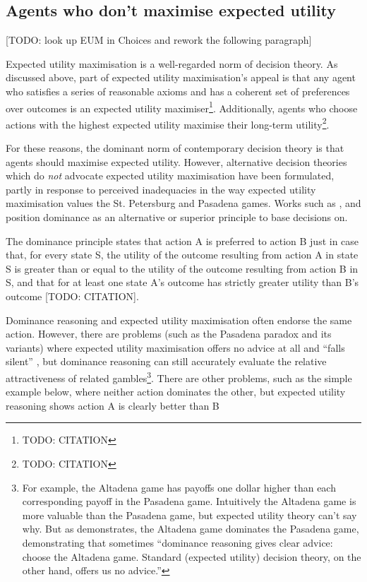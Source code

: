 \documentclass{article}
\begin{document}
\subsection{Agents who don't maximise expected utility}

[TODO: look up EUM in Choices and rework the following paragraph]

Expected utility maximisation is a well-regarded norm of decision theory. As discussed above, part of expected utility maximisation's appeal is that any agent who satisfies a series of reasonable axioms and has a coherent set of preferences over outcomes is an expected utility maximiser\footnote{TODO: CITATION}. Additionally, agents who choose actions with the highest expected utility maximise their long-term utility\footnote{TODO: CITATION}. 

For these reasons, the dominant norm of contemporary decision theory is that agents should maximise expected utility. However, alternative decision theories which do \textit{not} advocate expected utility maximisation have been formulated, partly in response to perceived inadequacies in the way expected utility maximisation values the St. Petersburg and Pasadena games. Works such as \citep{easwaran2009dominance}, \citep{colyvan2008relative} and \citep{colyvan2006no} position dominance as an alternative or superior principle to base decisions on.

The dominance principle states that action A is preferred to action B just in case that, for every state S, the utility of the outcome resulting from action A in state S is greater than or equal to the utility of the outcome resulting from action B in S, and that for at least one state A's outcome has strictly greater utility than B's outcome [TODO: CITATION]. 

Dominance reasoning and expected utility maximisation often endorse the same action. However, there are problems (such as the Pasadena paradox and its variants) where expected utility maximisation offers no advice at all and ``falls silent'' \citep{nover2004vexing}, but dominance reasoning can still accurately evaluate the relative attractiveness of related gambles\footnote{For example, the Altadena game has payoffs one dollar higher than each corresponding payoff in the Pasadena game. Intuitively the Altadena game is more valuable than the Pasadena game, but expected utility theory can't say why. But as \citep{colyvan2006no} demonstrates, the Altadena game dominates the Pasadena game, demonstrating that sometimes ``dominance reasoning gives clear advice: choose the Altadena game. Standard (expected utility) decision theory, on the other hand, offers us no advice.''}. There are other problems, such as the simple example below, where neither action dominates the other, but expected utility reasoning shows action A is clearly better than B
\end{document}
